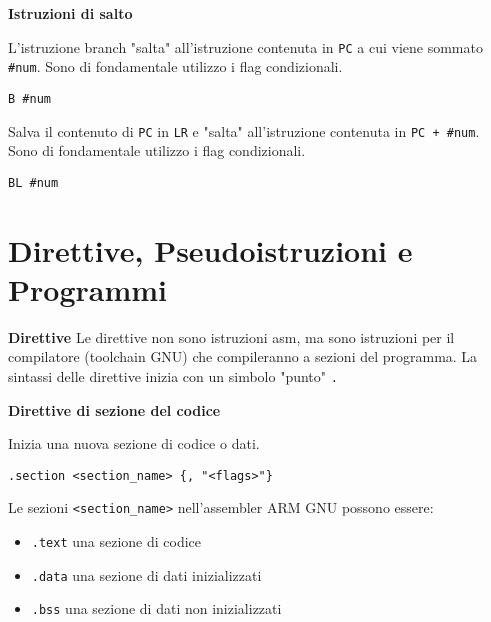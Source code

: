 \begin{defn}
	\textbf{Istruzioni di salto}
	
	L'istruzione branch "salta" all'istruzione contenuta in \verb|PC|  a cui viene sommato \verb|#num|. Sono di fondamentale utilizzo i flag condizionali.
	\begin{lstlisting}[style=arm]
	B #num
	\end{lstlisting}
	
	Salva il contenuto di \verb|PC| in \verb|LR| e "salta" all'istruzione contenuta in \verb|PC + #num|. Sono di fondamentale utilizzo i flag condizionali.
	\begin{lstlisting}[style=arm]
	BL #num
	\end{lstlisting}
\end{defn}

\section{Direttive, Pseudoistruzioni e Programmi}

\begin{defn}
	\textbf{Direttive}
	Le direttive non sono istruzioni asm, ma sono istruzioni per il compilatore (toolchain GNU) che compileranno a sezioni del programma. La sintassi delle direttive inizia con un simbolo "punto" \verb|.|	
\end{defn}

\begin{defn}
	\textbf{Direttive di sezione del codice}
	
	Inizia una nuova sezione di codice o dati.
	\begin{lstlisting}[style=arm]
	.section <section_name> {, "<flags>"}
	\end{lstlisting}
	
	Le sezioni \verb|<section_name>| nell'assembler ARM GNU possono essere:
	\begin{itemize}
		\item \verb|.text| una sezione di codice
		\item \verb|.data| una sezione di dati inizializzati
		\item \verb|.bss| una sezione di dati non inizializzati
	\end{itemize}
\end{defn}

